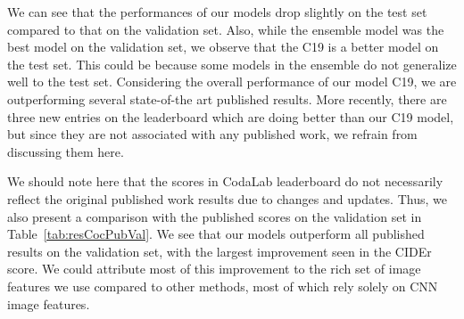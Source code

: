 We can see that the performances of our models drop slightly on the test set
compared to that on the validation set. 
Also, while the ensemble model was the best model on the validation set, we
observe that the C19 is a better model on the test set.
This could be because some models in the ensemble do not generalize well to the
test set.
Considering the overall performance of our model C19, we are outperforming
several state-of-the art published results.
More recently, there are three new entries on the leaderboard which are doing
better than our C19 model, but since they are not associated with any published
work, we refrain from discussing them here.

We should note here that the scores in CodaLab leaderboard do not necessarily
reflect the original published work results due to changes and updates.
Thus, we also present a comparison with the published scores on the validation
set in Table~\ref{tab:resCocPubVal}.
We see that our models outperform all published results on the validation set,
with the largest improvement seen in the CIDEr score.
We could attribute most of this improvement to the rich set of image features we
use compared to other methods, most of which rely solely on CNN image features.

